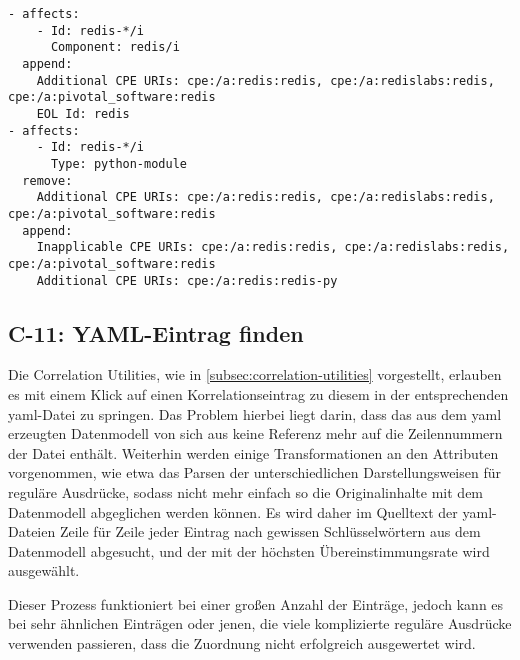 \begin{lstlisting}[style=yaml,caption={Korrelationseinträge in zwei unterschiedlichen Dateien, die aufeinander aufbauen},label={lst:correlation-order-depdendency-example}]
- affects:
    - Id: redis-*/i
      Component: redis/i
  append:
    Additional CPE URIs: cpe:/a:redis:redis, cpe:/a:redislabs:redis, cpe:/a:pivotal_software:redis
    EOL Id: redis
- affects:
    - Id: redis-*/i
      Type: python-module
  remove:
    Additional CPE URIs: cpe:/a:redis:redis, cpe:/a:redislabs:redis, cpe:/a:pivotal_software:redis
  append:
    Inapplicable CPE URIs: cpe:/a:redis:redis, cpe:/a:redislabs:redis, cpe:/a:pivotal_software:redis
    Additional CPE URIs: cpe:/a:redis:redis-py
\end{lstlisting}

\subsection{C-11: YAML-Eintrag finden}\label{subsec:c-11-finding-yaml-entries}

Die Correlation Utilities, wie in \autoref{subsec:correlation-utilities} vorgestellt, erlauben es mit einem Klick auf einen Korrelationseintrag zu diesem in der entsprechenden \acrshort{yaml}-Datei zu springen.
Das Problem hierbei liegt darin, dass das aus dem \acrshort{yaml} erzeugten Datenmodell von sich aus keine Referenz mehr auf die Zeilennummern der Datei enthält.
Weiterhin werden einige Transformationen an den Attributen vorgenommen, wie etwa das Parsen der unterschiedlichen Darstellungsweisen für reguläre Ausdrücke, sodass nicht mehr einfach so die Originalinhalte mit dem Datenmodell abgeglichen werden können.
Es wird daher im Quelltext der \acrshort{yaml}-Dateien Zeile für Zeile jeder Eintrag nach gewissen Schlüsselwörtern aus dem Datenmodell abgesucht, und der mit der höchsten Übereinstimmungsrate wird ausgewählt.

Dieser Prozess funktioniert bei einer großen Anzahl der Einträge, jedoch kann es bei sehr ähnlichen Einträgen oder jenen, die viele komplizierte reguläre Ausdrücke verwenden passieren, dass die Zuordnung nicht erfolgreich ausgewertet wird.
